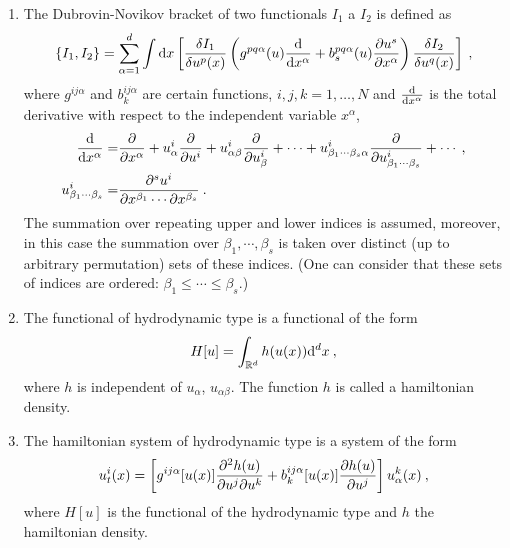 \begin{definition}
    \begin{enumerate}
        \item The Dubrovin-Novikov bracket of two functionals $I_1$ a $I_2$ is defined as
        \begin{align}
            \left \lbrace I_1,I_2 \right \rbrace = \sum_{\alpha = 1}^ d \int \mathrm{d} x 
            \left[ \frac{\delta I_1}{\delta u^p(x)} \left( g^{pq \alpha}(u) \frac{\mathrm{d}}{\mathrm{d}x^\alpha} + b^{pq\alpha}_s(u) \frac{\partial u^s}{\partial x^\alpha} \right) \frac{\delta I_2}{\delta u^q(x)} \right] \:, \label{eq:Dubrovin-Novikov bracket}
        \end{align}
        where $g^{ij \alpha}$ and $b_k^{ij \alpha}$ are certain functions, $i,j,k = 1, \dots, N$ and $\frac{\mathrm{d}}{\mathrm{d}x^\alpha}$ is the total derivative with respect to the independent variable $x^\alpha$,
        \begin{align}
            \frac{\mathrm{d}}{\mathrm{d}x^\alpha} =& \frac{\partial }{\partial x^\alpha} + u^i_\alpha \frac{\partial }{\partial u^i} + u^i_{\alpha \beta} \frac{\partial }{\partial u^i_\beta} + \cdots + u^i_{\beta_1 \cdots \beta_s \alpha} \frac{\partial }{\partial u^i_{\beta_1 \cdots \beta_s}} + \cdots \:, \\
            u^i_{\beta_1 \cdots \beta_s} =& \frac{\partial ^s u^i}{\partial x^{\beta_1} \cdots \partial x^{\beta_s}} \:.
        \end{align}
        The summation over repeating upper and lower indices is assumed, moreover, in this case the summation over $\beta_1, \cdots, \beta_s$ is taken over distinct (up to arbitrary permutation) sets of these indices. (One can consider that these sets of indices are ordered: $\beta_1 \leq \cdots \leq \beta_s$.)
        
        \item The functional of hydrodynamic type is a functional of the form
        \begin{align}
            H[u] = \int_{\mathbb{R}^d} h(u(x)) \mathrm{d}^d x \:,
        \end{align}
        where $h$ is independent of $u_\alpha$, $u_{\alpha \beta}$. The function $h$ is called a hamiltonian density.

        \item The hamiltonian system of hydrodynamic type is a system of the form
        \begin{align}
            u^i_t (x) = 
            \left[ g^{ij \alpha} [u(x)] \frac{\partial^2 h(u)}{\partial u^j \partial u^k} + b_k^{ij \alpha} [u(x)] \frac{\partial h(u)}{\partial u^j} \right] u_\alpha^k(x) \:,
        \end{align}
        where $H[u]$ is the functional of the hydrodynamic type and $h$ the hamiltonian density.
    \end{enumerate}
\end{definition}

